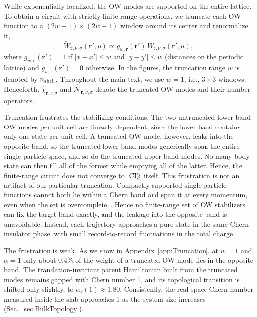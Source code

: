 \documentclass[aps,prb,10pt,twocolumn,superscriptaddress,longbibliography,floatfix]{revtex4-2}
\newcommand{\mc}[1]{\mathcal{#1}}
\newcommand{\mr}[1]{\mathrm{#1}}
\newcommand{\bfr}{\boldsymbol r}
\newcommand{\kett}[1]{\ket{#1}\!\rangle}
\newcommand{\CI}{\kett{\mr{CI}}}
\newcommand{\newtext}[1]{{\color{blue}#1}}
\newcommand{\claudeadd}[1]{{\color{orange}#1}}
\begin{document}
\label{sec:TruncatedOW}
While exponentially localized, the OW modes are supported on the entire lattice. To obtain a circuit with strictly finite-range operations, we truncate each OW function to a $(2w+1)\times(2w+1)$ window around its center and renormalize it,
\begin{equation}
    \widetilde W_{\bfr,\nu,\sigma}(\bfr',\mu)\propto g_{w,\bfr}(\bfr')\,W_{\bfr,\nu,\sigma}(\bfr',\mu),
    \label{eq:TruncatedOW}
\end{equation}
where $g_{w,\bfr}(\bfr')=1$ if $|x-x'|\leq w$ and $|y-y'|\leq w$ (distances on the periodic lattice) and $g_{w,\bfr}(\bfr')=0$ otherwise. In the figures, the truncation range $w$ is denoted by $n_{\rm shell}$. Throughout the main text, we use $w=1$, i.e., $3\times3$ windows. Henceforth, $\hat\chi_{\bfr,\nu,\sigma}$ and $\hat{\mc N}_{\bfr,\nu,\sigma}$ denote the truncated OW modes and their number operators.

Truncation frustrates the stabilizing conditions. The two untruncated lower-band OW modes per unit cell are linearly dependent, since the lower band contains only one state per unit cell. A truncated OW mode, however, leaks into the opposite band, so the truncated lower-band modes generically span the entire single-particle space, and so do the truncated upper-band modes. No many-body state can then fill all of the former while emptying all of the latter. Hence, the finite-range circuit does not converge to $\CI$ itself. \claudeadd{This frustration is not an artifact of our particular truncation. Compactly supported single-particle functions cannot both lie within a Chern band and span it at every momentum, even when the set is overcomplete~\cite{DubailRead2015}. Hence no finite-range set of OW stabilizers can fix the target band exactly, and the leakage into the opposite band is unavoidable.} Instead, each trajectory approaches a pure state in the same Chern-insulator phase, with small record-to-record fluctuations in the total charge.

The frustration is weak. As we show in Appendix~\ref{app:Truncation}, at $w=1$ and $\alpha=1$ only about $0.4\%$ of the weight of a truncated OW mode lies in the opposite band. The translation-invariant parent Hamiltonian built from the truncated modes remains gapped with Chern number 1, and its topological transition is shifted only slightly, to $\alpha_c(1)\approx1.80$. \newtext{Consistently, the real-space Chern number measured inside the slab approaches 1 as the system size increases (Sec.~\ref{sec:BulkTopology}).}
\end{document}
